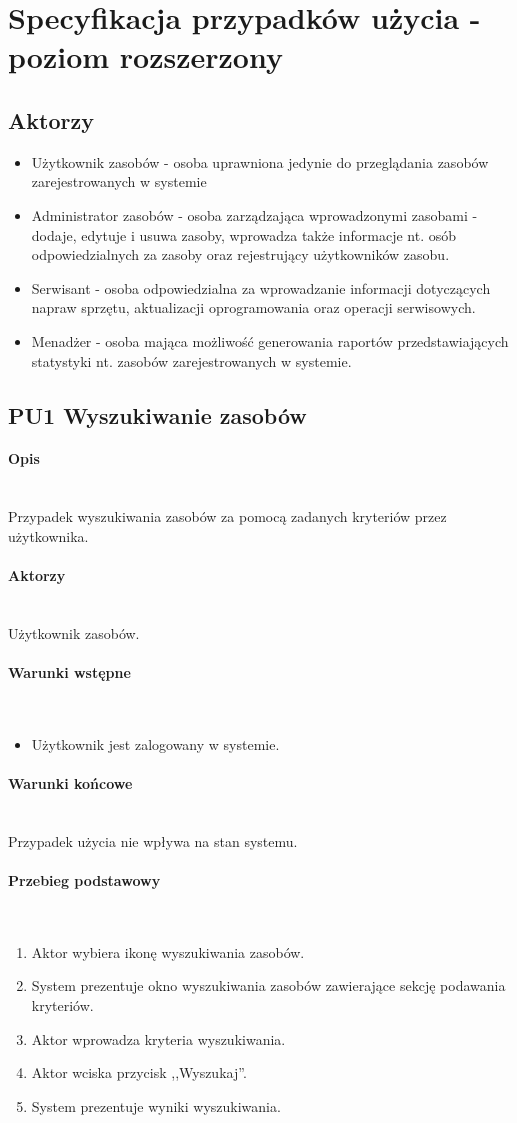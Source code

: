 \section{Specyfikacja przypadków użycia - poziom rozszerzony}
\newcommand{\myparagraph}[1]{\paragraph{#1}\mbox{}\\}

\subsection{Aktorzy}
\begin{itemize}
\item Użytkownik zasobów - osoba uprawniona jedynie do przeglądania zasobów zarejestrowanych w systemie
\item Administrator zasobów - osoba zarządzająca wprowadzonymi zasobami - dodaje, edytuje i usuwa zasoby, wprowadza także informacje nt. osób odpowiedzialnych za zasoby oraz rejestrujący użytkowników zasobu.
\item Serwisant - osoba odpowiedzialna za wprowadzanie informacji dotyczących napraw sprzętu, aktualizacji oprogramowania oraz operacji serwisowych.
\item Menadżer - osoba mająca możliwość generowania raportów przedstawiających statystyki nt. zasobów zarejestrowanych w systemie.
\end{itemize}


\subsection{PU1 Wyszukiwanie zasobów} \label{pu1}
\myparagraph{Opis}
Przypadek wyszukiwania zasobów za pomocą zadanych kryteriów przez użytkownika.

\myparagraph{Aktorzy}
Użytkownik zasobów.

\myparagraph{Warunki wstępne}
\begin{itemize}
\item Użytkownik jest zalogowany w systemie.
\end{itemize}

\myparagraph{Warunki końcowe}
Przypadek użycia nie wpływa na stan systemu.

\myparagraph{Przebieg podstawowy}
\begin{enumerate}
\item \label{pu1:f} Aktor wybiera ikonę wyszukiwania zasobów.
\item \label{pu1:s}System prezentuje okno wyszukiwania zasobów zawierające sekcję podawania kryteriów.
\item Aktor wprowadza kryteria wyszukiwania.
\item Aktor wciska przycisk ,,Wyszukaj''.
\item System prezentuje wyniki wyszukiwania.
\end{enumerate}

